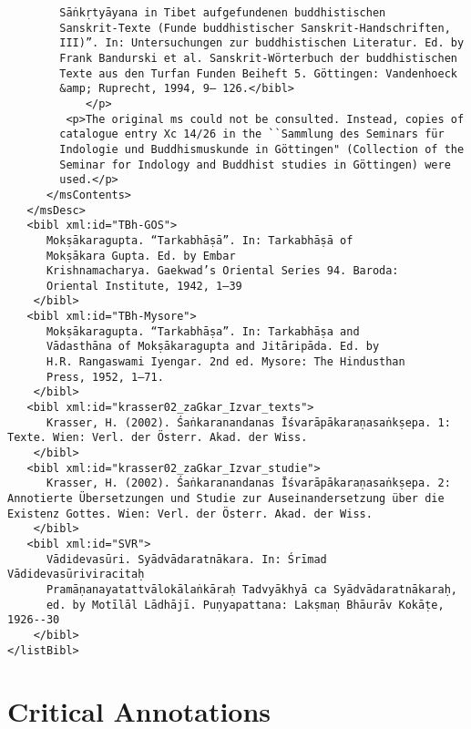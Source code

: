\documentclass[article,12pt,a4paper]{memoir}%
\begin{document}
\begin{verbatim}
	    Sāṅkṛtyāyana in Tibet aufgefundenen buddhistischen
	    Sanskrit-Texte (Funde buddhistischer Sanskrit-Handschriften,
	    III)”. In: Untersuchungen zur buddhistischen Literatur. Ed. by
	    Frank Bandurski et al. Sanskrit-Wörterbuch der buddhistischen
	    Texte aus den Turfan Funden Beiheft 5. Göttingen: Vandenhoeck
	    &amp; Ruprecht, 1994, 9– 126.</bibl>
	        </p>
         <p>The original ms could not be consulted. Instead, copies of
	    catalogue entry Xc 14/26 in the ``Sammlung des Seminars für
	    Indologie und Buddhismuskunde in Göttingen" (Collection of the
	    Seminar for Indology and Buddhist studies in Göttingen) were
	    used.</p>
      </msContents>
   </msDesc>
   <bibl xml:id="TBh-GOS">
	  Mokṣākaragupta. “Tarkabhāṣā”. In: Tarkabhāṣā of
	  Mokṣākara Gupta. Ed. by Embar
	  Krishnamacharya. Gaekwad’s Oriental Series 94. Baroda:
	  Oriental Institute, 1942, 1–39
	</bibl>
   <bibl xml:id="TBh-Mysore">
	  Mokṣākaragupta. “Tarkabhāṣa”. In: Tarkabhāṣa and
	  Vādasthāna of Mokṣākaragupta and Jitāripāda. Ed. by
	  H.R. Rangaswami Iyengar. 2nd ed. Mysore: The Hindusthan
	  Press, 1952, 1–71.
	</bibl>
   <bibl xml:id="krasser02_zaGkar_Izvar_texts">
	  Krasser, H. (2002). Śaṅkaranandanas Īśvarāpākaraṇasaṅkṣepa. 1: Texte. Wien: Verl. der Österr. Akad. der Wiss.
	</bibl>
   <bibl xml:id="krasser02_zaGkar_Izvar_studie">
	  Krasser, H. (2002). Śaṅkaranandanas Īśvarāpākaraṇasaṅkṣepa. 2: Annotierte Übersetzungen und Studie zur Auseinandersetzung über die Existenz Gottes. Wien: Verl. der Österr. Akad. der Wiss.
	</bibl>
   <bibl xml:id="SVR">
	  Vādidevasūri. Syādvādaratnākara. In: Śrīmad Vādidevasūriviracitaḥ
	  Pramāṇanayatattvālokālaṅkāraḥ Tadvyākhyā ca Syādvādaratnākaraḥ,
	  ed. by Motīlāl Lādhājī. Puṇyapattana: Lakṣmaṇ Bhāurāv Kokāṭe, 1926--30
	</bibl>
</listBibl>
       \end{verbatim}
     
\chapter[{Critical Annotations}][{Critical Annotations}]{Critical Annotations}                                                                                                              %
     
\end{document}

